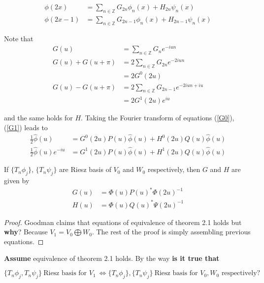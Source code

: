\documentclass[a4paper, 11pt]{article}
\begin{document}
\begin{align}
  \phi(2x) &= \sum_{n \in \mathbb{Z}} G_{2n} \phi_n(x) + H_{2n} \psi_n(x) \label{G0} \\
  \phi(2x-1) &= \sum_{n \in \mathbb{Z}} G_{2n-1} \phi_n(x) + H_{2n-1} \psi_n(x) \label{G1}
\end{align}

Note that
\begin{align*}
  G(u) &= \sum_{n \in \mathbb{Z}} G_n e^{-iun} \\
  G(u) + G(u+\pi) &= 2\sum_{n \in \mathbb{Z}} G_{2n} e^{-2iun} \\
  &= 2G^0(2u) \\
  G(u)-G(u+\pi) &= 2\sum_{n \in \mathbb{Z}} G_{2n-1} e^{-2iun+iu} \\
  &= 2G^1(2u)e^{iu}
\end{align*}

and the same holds for $H$. Taking the Fourier transform of equations (\ref{G0}), (\ref{G1}) leads to
\begin{align}
  \frac{1}{2} \hat{\phi}(u) &= G^0(2u)P(u)\hat{\phi}(u) + H^0(2u)Q(u)\hat{\phi}(u) \\
  \frac{1}{2} \hat{\phi}(u) e^{-iu} &= G^1(2u)P(u)\hat{\phi}(u) + H^1(2u)Q(u)\hat{\phi}(u)
\end{align}

\begin{thm}{2.2}
  If $\{T_n \phi_j\}$, $\{T_n \psi_j\}$ are Riesz basis of $V_0$ and $W_0$ respectively, then $G$ and $H$ are given  by 
  \begin{align*}
    G(u) &= \Phi(u){P(u)}^*{\Phi(2u)}^{-1} \\
    H(u) &= \Phi(u){Q(u)}^*{\Psi(2u)}^{-1}
  \end{align*}
\end{thm}

\begin{proof}
  Goodman claims that equations of equivalence of theorem 2.1 holds but \textbf{why}? Because $V_1 = V_0 \bigoplus W_0$.
  The rest of the proof is simply assembling previous equations.
\end{proof}

\textbf{Assume} equivalence of theorem 2.1 holds. By the way \textbf{is it true that}

\begin{equation*}
  \{T_n \phi_j, T_n \psi_j\} \ \text{Riesz  basis for $V_1$} \ \iff \{T_n \phi_j\}, \{T_n \psi_j\} \ \text{Riesz  basis 
  for $V_0, W_0$ respectively?}
\end{equation*}
\end{document}

